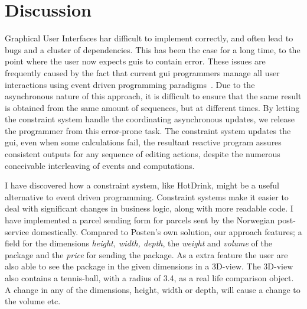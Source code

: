 \chapter{Discussion}
\label{chap:discussion}

Graphical User Interfaces har difficult to implement correctly, and often lead to bugs and a cluster of dependencies. This has been the case for a long time, to the point where the user now expects \gls{gui}s to contain error. These issues are frequently caused by the fact that current \gls{gui} programmers manage all user interactions using event driven programming paradigms~\cite{HotDrink}. Due to the asynchronous nature of this approach, it is difficult to ensure that the same result is obtained from the same amount of sequences, but at different times. By letting the constraint system handle the coordinating asynchronous updates, we release the programmer from this error-prone task. The constraint system updates the \gls{gui}, even when some calculations fail, the resultant reactive program assures consistent outputs for any sequence of editing actions, despite the numerous conceivable interleaving of events and computations.

I have discovered how a constraint system, like HotDrink, might be a useful alternative to event driven programming. Constraint systems make it easier to deal with significant changes in business logic, along with more readable code. I have implemented a parcel sending form for parcels sent by the Norwegian post-service domestically. Compared to Posten's own solution, our approach features; a field for the dimensions \textit{height, width, depth}, the \textit{weight} and \textit{volume} of the package and the \textit{price} for sending the package. As a extra feature the user are also able to see the package in the given dimensions in a 3D-view. The 3D-view also contains a tennis-ball, with a radius of 3.4, as a real life comparison object. A change in any of the dimensions, height, width or depth, will cause a change to the volume etc. 

